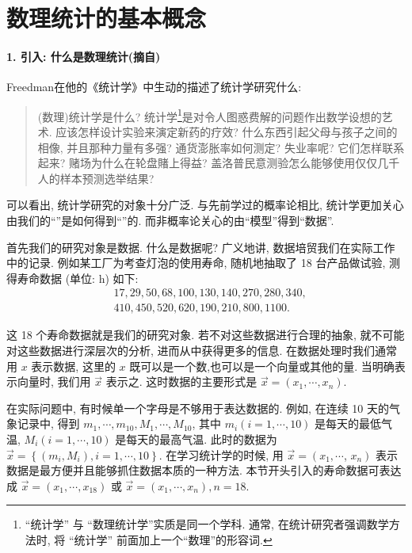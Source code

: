 \section{数理统计的基本概念}

\paragraph{1. 引入: 什么是数理统计(摘自\cite{probpku})}

Freedman在他的《统计学》中生动的描述了统计学研究什么: 
\begin{quote}
    (数理)统计学是什么? 统计学\footnote{``统计学'' 与 ``数理统计学''实质是同一个学科. 通常, 在统计研究者强调数学方法时, 将 ``统计学'' 前面加上一个``数理''的形容词.}是对令人图惑费解的问题作出数学设想的艺术. 应该怎样设计实验来演定新药的疗效? 什么东西引起父母与孩子之间的相像, 并且那种力量有多强? 通货澎胀率如何测定? 失业率呢? 它们怎样联系起来? 赌场为什么在轮盘賭上得益? 盖洛普民意测验怎么能够使用仅仅几千人的样本预测选举结果?
\end{quote}
可以看出, 统计学研究的对象十分广泛. 与先前学过的概率论相比, 统计学更加关心由我们的``''是如何得到``''的. 而非概率论关心的由``模型''得到``数据''. 

首先我们的研究对象是数据. 什么是数据呢? 广义地讲, 数据培贸我们在实际工作中的记录. 例如某工厂为考查灯泡的使用寿命, 随机地抽取了 18 台产品做试验, 测得寿命数据 (单位: h) 如下:
$$
\begin{aligned}
& 17,29,50,68,100,130,140,270,280,340, \\
& 410,450,520,620,190,210,800,1100 .
\end{aligned}
$$

这 18 个寿命数据就是我们的研究对象. 若不对这些数据进行合理的抽象, 就不可能对这些数据进行深层次的分析, 进而从中获得更多的信息. 在数据处理时我们通常用 $x$ 表示数据, 这里的 $x$ 既可以是一个数,也可以是一个向量或其他的量. 当明确表示向量时, 我们用 $\vec x$ 表示之. 这时数据的主要形式是 $\vec x=\left(x_1, \cdots, x_n\right)$.

在实际问题中, 有时候单一个字母是不够用于表达数据的. 例如, 在连续 10 天的气象记录中, 得到 $m_1, \cdots, m_{10}, M_1, \cdots, M_{10}$, 其中 $m_i(i=1, \cdots, 10)$ 是每天的最低气温, $M_i(i=1, \cdots, 10)$ 是每天的最高气温. 此时的数据为 $\vec x=\left\{\left(m_i, M_i\right), i=1, \cdots, 10\right\}$. 在学习统计学的时候, 用 $\vec x=\left(x_1, \cdots\right.$, $\left.x_n\right)$ 表示数据是最方便并且能够抓住数据本质的一种方法. 本节开头引入的寿命数据可表达成 $\vec x=\left(x_1, \cdots, x_{18}\right)$ 或 $\vec x=\left(x_1, \cdots, x_n\right), n=18$.

